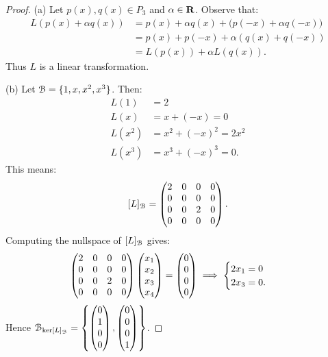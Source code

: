 \documentclass[10pt,twoside,openany]{memoir}
\begin{document}
    {\color{blue} \begin{proof}
        (a) Let $p(x),q(x) \in P_3$ and $\alpha \in \mathbf{R}$. Observe that:
            \begin{equation*}
            \begin{split}
                L(p(x) + \alpha q(x))
                & = p(x) + \alpha q(x) + \bigl(p(-x) + \alpha q(-x)\bigr) \\
                & = p(x) + p(-x) + \alpha(q(x) + q(-x)) \\
                & = L(p(x)) + \alpha L(q(x)).
            \end{split}
            \end{equation*}
        Thus $L$ is a linear transformation.

        (b) Let $\mathcal{B} = \{1,x,x^2,x^3\}$. Then:
            \begin{equation*}
            \begin{split}
                L(1) &= 2 \\
                L(x) &= x + (-x) = 0 \\
                L(x^2) &= x^2 + (-x)^2 = 2x^2 \\
                L(x^3) &= x^3 + (-x)^3 = 0.
            \end{split}
            \end{equation*}
        This means:
            \begin{equation*}
            \begin{split}
                [L]_{\mathcal{B}} = \left( \begin{matrix} 2 & 0 & 0 & 0 \\ 0 & 0 & 0 & 0 \\ 0 & 0 & 2 & 0 \\ 0 & 0 & 0 & 0 \end{matrix} \right).
            \end{split}
            \end{equation*}
        Computing the nullspace of $[L]_{\mathcal{B}}$ gives:
            \begin{equation*}
            \begin{split}
                \left( \begin{matrix} 2 & 0 & 0 & 0 \\ 0 & 0 & 0 & 0 \\ 0 & 0 & 2 & 0 \\ 0 & 0 & 0 & 0 \end{matrix} \right) \left( \begin{matrix} x_1 \\ x_2 \\ x_3 \\ x_4 \end{matrix} \right) = \left( \begin{matrix} 0 \\ 0 \\ 0 \\ 0 \end{matrix} \right)
                & \implies \begin{cases}
                2x_1 = 0 \\ 2x_3 = 0.
                \end{cases}
            \end{split}
            \end{equation*}
        Hence $\mathcal{B}_{\ker[L]_{\mathcal{B}}} = \left\{ \left( \begin{matrix} 0 \\ 1 \\ 0 \\ 0 \end{matrix} \right) , \left( \begin{matrix} 0 \\ 0 \\ 0 \\ 1 \end{matrix} \right) \right\}$.



\end{proof}}
\end{document}
